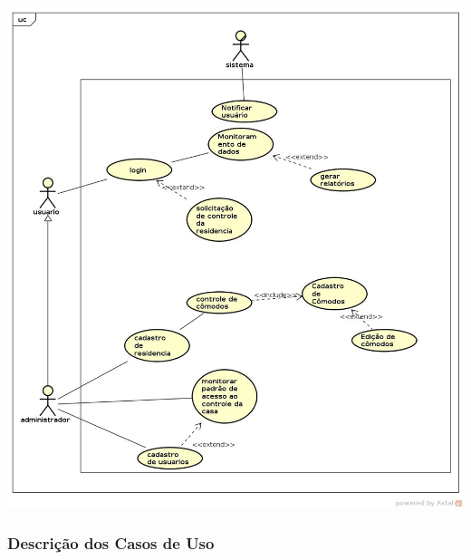 \begin{center}
\includegraphics[width=\textwidth]{figuras/usecases}
\end{center}

\newpage

\subsubsection{Descrição dos Casos de Uso}

